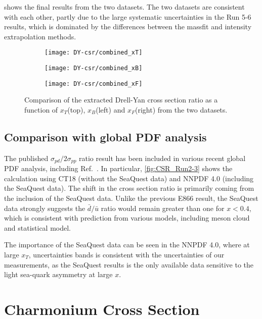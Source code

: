 \documentclass[../main.tex]{subfiles}
\begin{document}
 shows the final results from the two datasets. The two datasets
are consistent with each other, partly due to the large systematic uncertainties in the
Run 5-6 results, which is dominated by the differences between the massfit and intensity
extrapolation methods.
\begin{figure}
	\centering
	\begin{subfigure}{0.6\linewidth}
		\texttt{[image: DY-csr/combined\_xT]}
	\end{subfigure}
	\begin{subfigure}{0.45\linewidth}
		\texttt{[image: DY-csr/combined\_xB]}
	\end{subfigure}
	\begin{subfigure}{0.45\linewidth}
		\texttt{[image: DY-csr/combined\_xF]}
	\end{subfigure}
	\caption{Comparison of the extracted Drell-Yan cross section ratio as a function of $x_T$(top),  $x_B$(left)
		and $x_F$(right) from the two datasets.}
	\label{fig:CSR_combined}
\end{figure}


\subsection{Comparison with global PDF analysis}
The published $\sigma_{pd}/2\sigma_{pp}$ ratio result has been included in various recent global
PDF analysis, including Ref.~\cite{cocuzza2021,guzzi2022,accardi2023,alekhin2023}.
In particular, \cref{fig:CSR_Run2-3} shows the calculation using CT18 (without the SeaQuest data)
and NNPDF 4.0 (including the SeaQuest data). The shift in the cross section ratio is primarily
coming from the inclusion of the SeaQuest data. Unlike the previous E866 result, the SeaQuest data
strongly suggests the $\bar{d}/\bar{u}$ ratio would remain greater than one for $x<0.4$, which is
consistent with prediction from various models, including meson cloud and statistical model.

The importance of the SeaQuest data can be seen in the NNPDF 4.0, where at large $x_T$,
uncertainties bands is consistent with the uncertainties of our measurements, as the SeaQuest
results is the only available data sensitive to the light sea-quark asymmetry at large $x$.
\FloatBarrier

\section{Charmonium Cross Section}
\end{document}
